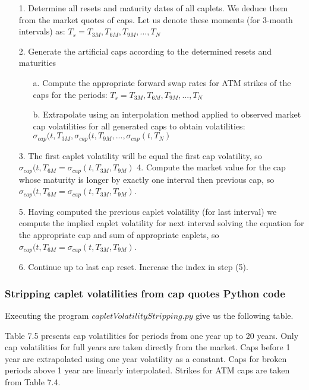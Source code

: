 \documentclass[11pt]{article}
\numberwithin{equation}{subsection}
\begin{document}
\begin{enumerate}
	\item [1.] Determine all resets and maturity dates of all caplets. We deduce them from the market
	quotes of caps. Let us denote these moments (for 3-month intervals) as: 
	\(T_s=T_{3M}, T_{6M}, T_{9M}, ...,T_{N}\)
	\item [2.] Generate the artificial caps according to the determined resets and maturities
	\begin{enumerate}
		\item [a.] Compute the appropriate forward swap rates for ATM strikes of the caps for the
		periods: \(T_s=T_{3M}, T_{6M}, T_{9M}, ...,T_{N}\)
		\item [b.] Extrapolate using an interpolation method applied to observed market
		cap volatilities for all generated caps to obtain volatilities:
		\(\sigma_{cap}(t, T_{3M}, \sigma_{cap}(t, T_{9M},..., \sigma_{cap}(t, T_{N})\)
	\end{enumerate}
	\item [3.] The first caplet volatility will be equal the first cap volatility, so \(\sigma_{cap}(t, T_{6M} = \sigma_{cap}(t, T_{3M}, T_{9M})\)
	4. Compute the market value for the cap whose maturity is longer by exactly one interval
	then previous cap, so \(\sigma_{cap}(t, T_{6M} = \sigma_{cap}(t, T_{3M}, T_{9M})\).
	\item [5.] Having computed the previous caplet volatility (for last interval) we compute the implied
	caplet volatility for next interval solving the equation for the appropriate cap and sum of
	appropriate caplets, so \(\sigma_{cap}(t, T_{6M} = \sigma_{cap}(t, T_{3M}, T_{9M})\).
	\item [6.] Continue up to last cap reset. Increase the index in step (5).
\end{enumerate}

\subsubsection{Stripping caplet volatilities from cap quotes Python code}
Executing the program \(capletVolatilityStripping.py\) give us the following table. 

Table 7.5 presents cap volatilities for periods from one year up to 20 years. Only cap volatilities
for full years are taken directly from the market. Caps before 1 year are extrapolated
using one year volatility as a constant. Caps for broken periods above 1 year are linearly
interpolated. Strikes for ATM caps are taken from Table 7.4.
\end{document}
